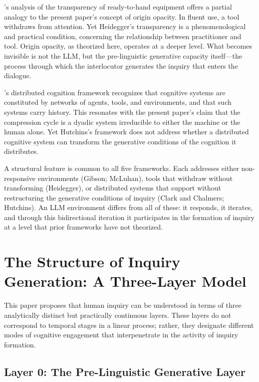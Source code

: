 \documentclass[12pt]{article}
\begin{document}
\citet{heidegger1977}'s analysis of the transparency of ready-to-hand equipment offers a partial analogy to the present paper's concept of origin opacity. In fluent use, a tool withdraws from attention. Yet Heidegger's transparency is a phenomenological and practical condition, concerning the relationship between practitioner and tool. Origin opacity, as theorized here, operates at a deeper level. What becomes invisible is not the LLM, but the pre-linguistic generative capacity itself---the process through which the interlocutor generates the inquiry that enters the dialogue.

\citet{hutchins1995}'s distributed cognition framework recognizes that cognitive systems are constituted by networks of agents, tools, and environments, and that such systems carry history. This resonates with the present paper's claim that the compression cycle is a dyadic system irreducible to either the machine or the human alone. Yet Hutchins's framework does not address whether a distributed cognitive system can transform the generative conditions of the cognition it distributes.

A structural feature is common to all five frameworks. Each addresses either non-responsive environments (Gibson; McLuhan), tools that withdraw without transforming (Heidegger), or distributed systems that support without restructuring the generative conditions of inquiry (Clark and Chalmers; Hutchins). An LLM environment differs from all of these: it responds, it iterates, and through this bidirectional iteration it participates in the formation of inquiry at a level that prior frameworks have not theorized.

\section{The Structure of Inquiry Generation: A Three-Layer Model}

This paper proposes that human inquiry can be understood in terms of three analytically distinct but practically continuous layers. These layers do not correspond to temporal stages in a linear process; rather, they designate different modes of cognitive engagement that interpenetrate in the activity of inquiry formation.

\subsection{Layer 0: The Pre-Linguistic Generative Layer}
\end{document}
